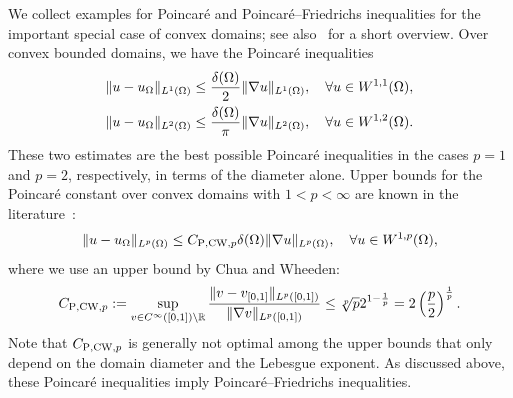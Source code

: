 \documentclass[10pt,letterpaper]{article}
\begin{document}
We collect examples for Poincar\'e and Poincar\'e--Friedrichs inequalities for the important special case of convex domains; 
see also~\cite[Lemma~3.24]{ern2021finite} for a short overview. 
Over convex bounded domains, we have the Poincar\'e inequalities~\cite{bebendorf2003note,acosta2004optimal} 
\begin{align}\label{math:acostaduran}
    \| u - u_{\Omega} \|_{L^{1}(\Omega)}
    \leq 
    \frac{{\delta}(\Omega)}{2}
    \| \nabla u \|_{L^{1}(\Omega)}
    ,
    \quad 
    \forall 
    u \in W^{1,1}(\Omega)
    ,
    \\
    \| u - u_{\Omega} \|_{L^{2}(\Omega)} \label{math:bebendorf}
    \leq 
    \frac{{\delta}(\Omega)}{\pi}
    \| \nabla u \|_{L^{2}(\Omega)}
    ,
    \quad 
    \forall 
    u \in W^{1,2}(\Omega)
    .
\end{align}
These two estimates are the best possible Poincar\'e inequalities in the cases $p=1$ and $p=2$, respectively, in terms of the diameter alone. 
Upper bounds for the Poincar\'e constant over convex domains with $1 < p < \infty$ are known in the literature~\cite[Theorem~1.1, Theorem~1.2]{chua2006estimates}:
\begin{align}\label{math:chuawheeden}
    \| u - u_{\Omega} \|_{L^{p}(\Omega)}
    \leq 
    C_{{\rm P},{\rm CW},p}
    {\delta}(\Omega)
    \| \nabla u \|_{L^{p}(\Omega)}
    ,
    \quad 
    \forall 
    u \in W^{1,p}(\Omega)
    ,
\end{align}
where we use an upper bound by Chua and Wheeden:
\begin{align*}
    C_{{\rm P},{\rm CW},p} 
    := 
    \sup\limits_{ v \in C^\infty([0,1]) \setminus {\mathbb R} } 
    \frac{ 
        \| v - v_{[0,1]} \|_{L^{p}([0,1])} 
    }{ 
        \| \nabla v \|_{L^{p}([0,1])} 
    }
    \leq 
    \sqrt[p]{p} 2^{1-\frac 1 p}
    =
    2
    \left( \frac p 2 \right)^{\frac 1 p}
    .
\end{align*} %
Note that $C_{{\rm P},{\rm CW},p}$ is generally not optimal among the upper bounds that only depend on the domain diameter and the Lebesgue exponent.
As discussed above, these Poincar\'e inequalities imply Poincar\'e--Friedrichs inequalities. 
\end{document}
